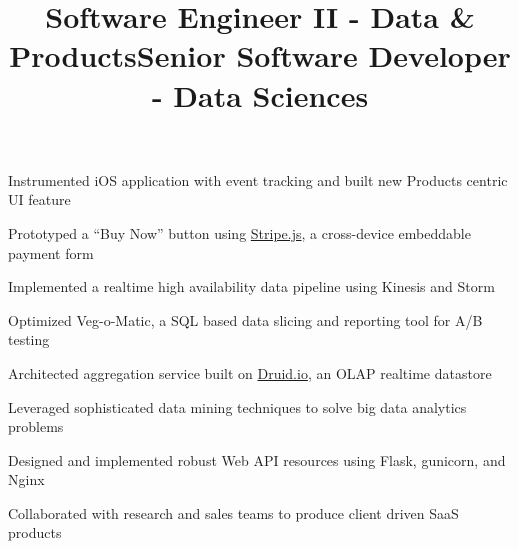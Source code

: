 \documentclass[12pt, tweaklist, line]{res}
\let\tempone\itemize
\let\temptwo\enditemize
\renewenvironment{itemize}{\tempone\vspace{-.15in}\setlength{\topsep}{0pt}\setlength{\itemsep}{3pt}\vspace{-.15in}}{\temptwo}
\def\Cplusplus{{\rm C\raise.5ex\hbox{\small ++}}}
\begin{document}
\begin{resume}
\title{Software Engineer II - Data \& Products}
\begin{position}
\begin{itemize}
\item Instrumented iOS application with event tracking and built new Products centric UI feature
\item Prototyped a ``Buy Now'' button using \href{https://stripe.com/}{Stripe.js}, a cross-device embeddable payment form
\item Implemented a realtime high availability data pipeline using Kinesis and Storm
\item Optimized Veg-o-Matic, a SQL based data slicing and reporting tool for A/B testing
\item Architected aggregation service built on \href{http://druid.io/}{Druid.io}, an OLAP realtime datastore
\end{itemize}
\end{position}

\title{Senior Software Developer - Data Sciences}
\begin{position}
\begin{itemize}
\item Leveraged sophisticated data mining techniques to solve big data analytics problems
\item Designed and implemented robust Web API resources using Flask, gunicorn, and Nginx
\item Collaborated with research and sales teams to produce client driven SaaS products
\end{itemize}
\end{position}


\end{resume}
\end{document}
